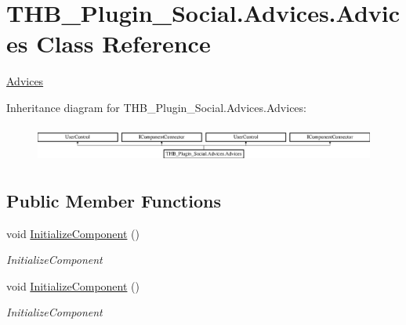 \hypertarget{class_t_h_b___plugin___social_1_1_advices_1_1_advices}{}\section{T\+H\+B\+\_\+\+Plugin\+\_\+\+Social.\+Advices.\+Advices Class Reference}
\label{class_t_h_b___plugin___social_1_1_advices_1_1_advices}


\mbox{\hyperlink{class_t_h_b___plugin___social_1_1_advices_1_1_advices}{Advices}}  


Inheritance diagram for T\+H\+B\+\_\+\+Plugin\+\_\+\+Social.\+Advices.\+Advices\+:\begin{figure}[H]
\begin{center}
\leavevmode
\includegraphics[height=1.228070cm]{dc/d36/class_t_h_b___plugin___social_1_1_advices_1_1_advices}
\end{center}
\end{figure}
\subsection*{Public Member Functions}
\begin{DoxyCompactItemize}
\item 
void \mbox{\hyperlink{class_t_h_b___plugin___social_1_1_advices_1_1_advices_a270ffdf24c38f6c886996ff608b940a2}{Initialize\+Component}} ()
\begin{DoxyCompactList}\small\item\em Initialize\+Component \end{DoxyCompactList}\item 
void \mbox{\hyperlink{class_t_h_b___plugin___social_1_1_advices_1_1_advices_a270ffdf24c38f6c886996ff608b940a2}{Initialize\+Component}} ()
\begin{DoxyCompactList}\small\item\em Initialize\+Component \end{DoxyCompactList}\end{DoxyCompactItemize}
